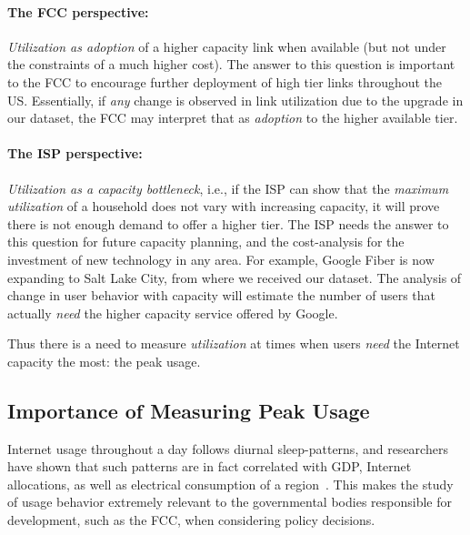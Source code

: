 \paragraph{The FCC perspective: }\emph{Utilization as adoption} of a higher capacity
link when available (but not under the constraints of a much higher cost). The answer to this
question is important to the FCC to encourage further deployment of high tier links throughout
the US. Essentially, if \emph{any} change is observed in link utilization due to the upgrade in our dataset, the FCC may interpret that as \emph{adoption} to the higher available tier.

\paragraph{The ISP perspective: }\emph{Utilization as a capacity bottleneck}, i.e., if
the ISP can show that the \emph{maximum utilization} of a household does not vary
with increasing capacity, it will prove there is not enough demand to offer a higher tier.  
The ISP needs the answer to this question for future capacity planning, and the cost-analysis
for the investment of new technology in any area.
For example, Google Fiber is now expanding to Salt Lake City, from where we received our dataset.
The analysis of change in user behavior with capacity will estimate the number of users that
actually \emph{need} the higher capacity service offered by Google.

Thus there is a need to measure \emph{utilization} at times when users \emph{need} the Internet
capacity the most: the peak usage.

\subsection{Importance of Measuring Peak Usage}

Internet usage throughout a day follows diurnal sleep-patterns, and researchers
have shown that such patterns are in fact correlated with GDP, Internet allocations,
as well as electrical consumption of a region~\cite{ant-diurnal-web}. This makes
the study of usage behavior extremely relevant to the governmental bodies responsible
for development, such as the FCC, when considering policy decisions. 


